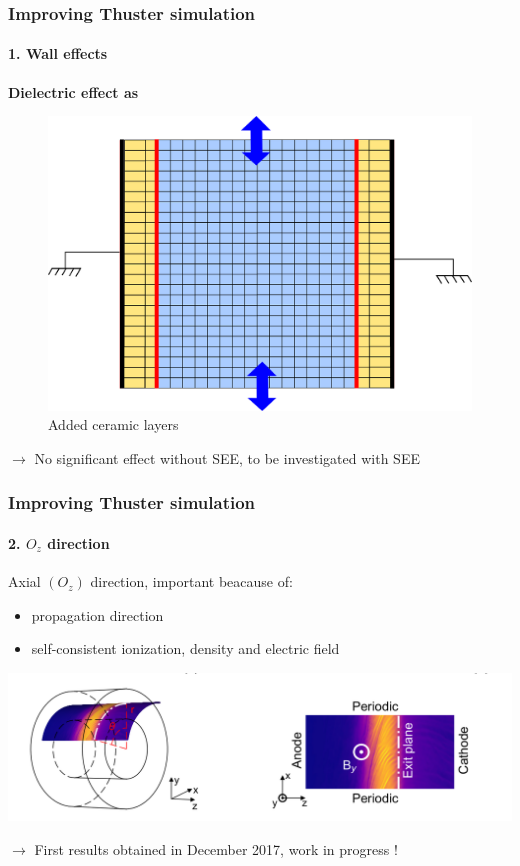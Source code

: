\documentclass[sans, aspectratio=169]{beamer}
\begin{document}
\begin{frame} 
	\frametitle{Improving Thuster simulation} 
	\framesubtitle{ 1. Wall effects} 

	\textbf{ Dielectric effect as }
	\begin{figure}[hbtp]
		\centering
		\includegraphics[scale=0.4]{images/2D_diel_Rtheta.png}
		\caption{Added ceramic layers}
	\end{figure}
	
	$\rightarrow$ No significant effect without SEE, to be investigated with SEE 
	
\end{frame}


\begin{frame} 
	\frametitle{Improving Thuster simulation} 
	\framesubtitle{2. $O_z$ direction} 

	Axial $(O_z)$ direction, important beacause of:
	\begin{itemize}
		\item propagation direction
		\item self-consistent ionization, density and electric field
	\end{itemize}		
	
	\includegraphics[scale=0.3]{images/ztheta.png} 
	
	$\rightarrow$ First results obtained in December 2017, work in progress !
\end{frame}
\end{document}
